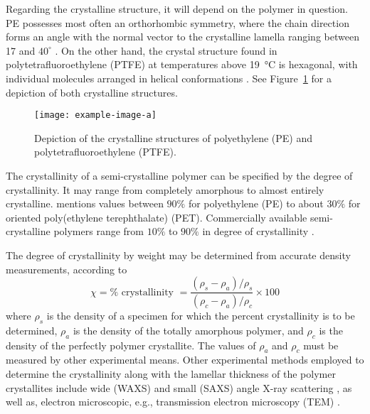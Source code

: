Regarding the crystalline structure, it will depend on the polymer in question.
PE possesses most often an orthorhombic symmetry, where the chain direction forms an angle with the normal vector to the crystalline lamella ranging between 17 and $40^\circ$ \citep{nikolovMicroMacroConstitutive2000}.
On the other hand, the crystal structure found in polytetrafluoroethylene (PTFE) at temperatures above \SI{19}{\celsius} is hexagonal, with individual molecules arranged in helical conformations \citep{bergstromMechanicsSolidPolymers2015}.
See Figure~\ref{fig:crystalline_structure_PE_PTFE} for a depiction of both crystalline structures.
\begin{figure}[hbtp]
	\texttt{[image: example-image-a]}
	\caption{Depiction of the crystalline structures of polyethylene (PE) and polytetrafluoroethylene (PTFE).}
\label{fig:crystalline_structure_PE_PTFE}
\end{figure}

The crystallinity of a semi-crystalline polymer can be specified by the degree of crystallinity.
It may range from completely amorphous to almost entirely crystalline.
\cite{wardIntroductionMechanicalProperties2004} mentions values between $90\%$ for polyethylene (PE) to about $30\%$ for oriented poly(ethylene terephthalate) (PET).
Commercially available semi-crystalline polymers range from $10\%$ to $90\%$ in degree of crystallinity \citep{vandommelenMicromechanicalModelingElastoviscoplastic2003}.

The degree of crystallinity by weight may be determined from accurate density measurements, according to
\begin{equation}
	\chi = \% \text { crystallinity }=\frac{\left(\rho_{s}-\rho_{a}\right)/\rho_{s}}{\left(\rho_{c}-\rho_{a}\right)/\rho_{c}} \times 100
\end{equation}
where $\rho_{s}$ is the density of a specimen for which the percent crystallinity is to be determined, $\rho_{a}$ is the density of the totally amorphous polymer, and $\rho_{c}$ is the density of the perfectly polymer crystallite.
The values of $\rho_{a}$ and $\rho_{c}$ must be measured by other experimental means.
Other experimental methods employed to determine the crystallinity along with the lamellar thickness of the polymer crystallites include wide (WAXS) and small (SAXS) angle X-ray scattering \citep{schrauwenIntrinsicDeformationBehavior2004, hobeikaTemperatureStrainRate2000}, as well as, electron microscopic, e.g., transmission electron microscopy (TEM) \citep{bartczakEvolutionCrystallineTexture1992}.

